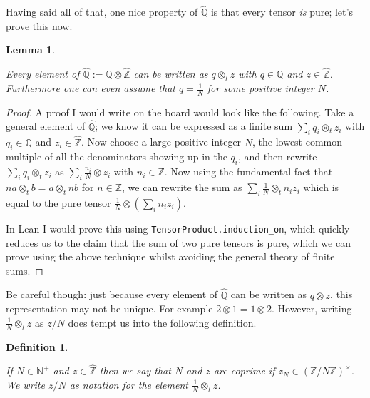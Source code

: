 \documentclass[10pt,a4paper]{article}
\newcommand{\Z}{\mathbb{Z}}
\newcommand{\N}{\mathbb{N}}
\newcommand{\Q}{\mathbb{Q}}
\newcommand{\Qhat}{\widehat{\Q}}
\newcommand{\Zhat}{\widehat{\Z}}
\newtheorem{lemma}[theorem]{Lemma}
\newtheorem{definition}[theorem]{Definition}
\newcommand{\uses}[1]{}
\newcommand{\lean}[1]{}
\newcommand{\leanok}{}
\begin{document}
Having said all of that, one nice property of $\Qhat$ is that every tensor \emph{is} pure;
let's prove this now.

\begin{lemma}
    \label{QHat.canonicalForm}
    \lean{QHat.canonicalForm}
    \uses{QHat,ZHat.commRing}
    \leanok
    Every element of $\Qhat:=\Q\otimes\Zhat$ can be written as $q\otimes_t z$ with $q\in\Q$ and $z\in\Zhat$.
    Furthermore one can even assume that $q=\frac{1}{N}$ for some positive integer $N$.
\end{lemma}
\begin{proof} \leanok
    A proof I would write on the board would look like the following. Take a general
    element of $\Qhat$; we know it can be expressed as a finite sum
    $\sum_i q_i\otimes_t z_i$ with $q_i\in\Q$ and $z_i\in\Zhat$. Now choose a large
    positive integer $N$, the lowest common multiple of all the denominators showing up in the
    $q_i$, and then rewrite $\sum_i q_i\otimes_t z_i$ as $\sum_i \frac{n_i}{N}\otimes z_i$ with
    $n_i\in\Z$. Now using the fundamental fact that $na\otimes_t b=a\otimes_t nb$ for $n\in\Z$,
    we can rewrite the sum as $\sum_i \frac{1}{N}\otimes_t n_i z_i$
    which is equal to the pure tensor $\frac{1}{N}\otimes(\sum_i n_i z_i)$.

    In Lean I would prove this using {\tt TensorProduct.induction\_on}, which quickly
    reduces us to the claim that the sum of two pure tensors is pure, which we can prove
    using the above technique whilst avoiding the general theory of finite sums.
\end{proof}

Be careful though: just because every element of $\Qhat$ can be written as $q\otimes z$, this
representation may not be unique. For example $2\otimes 1=1\otimes 2$. However, writing
$\frac{1}{N}\otimes_t z$ as $z/N$ does tempt us into the following definition.

\begin{definition}
    \label{QHat.IsCoprime}
    \lean{QHat.IsCoprime}
    \uses{ZHat.commRing}
    \leanok
    If $N\in\N^+$ and $z\in\Zhat$ then we say that $N$ and $z$ are \emph{coprime} if
    $z_N\in(\Z/N\Z)^\times$. We write $z/N$ as notation
    for the element $\frac{1}{N}\otimes_tz$.
\end{definition}
\end{document}
